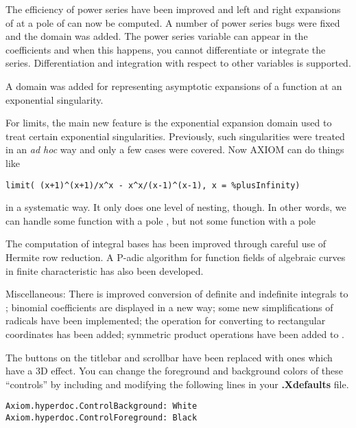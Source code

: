 The efficiency of power series have been improved and left and right
expansions of  at  a pole of 
can now be computed.
A number of power series bugs were fixed and the 
domain was added.
The power series variable can appear in the coefficients and when this
happens, you cannot differentiate or integrate the series.  Differentiation
and integration with respect to other variables is supported.

A domain was added for representing asymptotic expansions of a
function at an exponential singularity.

For limits, the main new feature is the exponential expansion domain used
to treat certain exponential singularities.  Previously, such singularities
were treated in an {\it ad hoc} way and only a few cases were covered.  Now
AXIOM can do things like

\begin{verbatim}
limit( (x+1)^(x+1)/x^x - x^x/(x-1)^(x-1), x = %plusInfinity)
\end{verbatim}

in a systematic way.  It only does one level of nesting, though.  In other
words, we can handle  some function with a pole \spad{)}, but not
\linebreak {} some function with a pole 

The computation of integral bases has been improved through careful
use of Hermite row reduction. A P-adic algorithm
for function fields of algebraic curves in finite characteristic has also
been developed.

Miscellaneous:
There is improved conversion of definite and indefinite integrals to
;
binomial coefficients are displayed in a new way;
some new simplifications of radicals have been implemented;
the operation  for converting to rectangular coordinates
has been added;
symmetric product operations have been added to .


The buttons on the titlebar and scrollbar have been replaced
with ones which have a 3D effect. You can change the foreground and
background colors of these ``controls'' by including and modifying
the following lines in your {\bf .Xdefaults} file.
\begin{verbatim}
Axiom.hyperdoc.ControlBackground: White
Axiom.hyperdoc.ControlForeground: Black
\end{verbatim}

